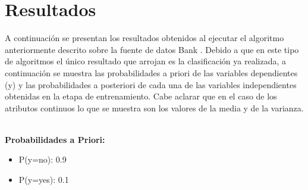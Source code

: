 \documentclass[letterpaper, 10 pt, conference]{ieeeconf}
\begin{document}
\section{Resultados}
A continuación se presentan los resultados obtenidos al ejecutar el algoritmo anteriormente descrito sobre la fuente de datos Bank \cite{dataset:2019}. Debido a que en este tipo de algoritmos el único resultado que arrojan es la clasificación ya realizada, a continuación se muestra las probabilidades a priori de las variables dependientes (y) y las probabilidades a posteriori de cada una de las variables independientes obtenidas en la etapa de entrenamiento. Cabe aclarar que en el caso de los atributos continuos lo que se muestra son los valores de la media y de la varianza.

\textbf{\\Probabilidades a Priori:}
\begin{itemize}
    \item P(y=no): 0.9
    \item P(y=yes): 0.1
\end{itemize}
\end{document}
